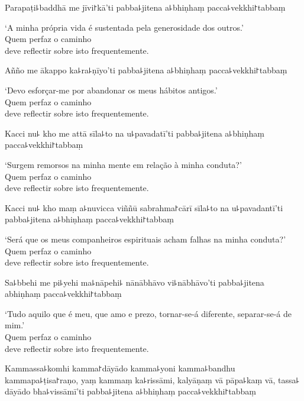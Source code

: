 \documentclass[
  babelLanguage=english,
  final,
  webversion,
]{chantingbook}
\begin{document}
Parapaṭi꜕baddhā me jīvi꜓kā'ti pabba꜕jitena a꜕bhiṇhaṃ pacca꜕vekkhi꜓tabbaṃ

\begin{english}
  `A minha própria vida é sustentada pela generosidade dos outros.'\\
  Quem perfaz o caminho\\
  deve reflectir sobre isto frequentemente.
\end{english}

Añño me ākappo ka꜕ra꜕ṇīyo'ti pabba꜕jitena a꜕bhiṇhaṃ pacca꜕vekkhi꜓tabbaṃ

\begin{english}
  `Devo esforçar-me por abandonar os meus hábitos antigos.'\\
  Quem perfaz o caminho\\
  deve reflectir sobre isto frequentemente.
\end{english}

\clearpage

Kacci nu꜕ kho me attā sīla꜕to na u꜕pavadatī'ti pabba꜕jitena a꜕bhiṇhaṃ pacca꜕vekkhi꜓tabbaṃ

\begin{english}
  `Surgem remorsos na minha mente em relação à minha conduta?'\\
  Quem perfaz o caminho\\
  deve reflectir sobre isto frequentemente.
\end{english}

Kacci nu꜕ kho maṃ a꜕nuvicca viññū sabrahma꜓cārī sīla꜕to na u꜕pavadantī'ti pabba꜕jitena a꜕bhiṇhaṃ pacca꜕vekkhi꜓tabbaṃ

\begin{english}
  `Será que os meus companheiros espirituais acham falhas na minha conduta?'\\
  Quem perfaz o caminho\\
  deve reflectir sobre isto frequentemente.
\end{english}

Sa꜕bbehi me pi꜕yehi ma꜕nāpehi꜕ nānābhāvo vi꜕nābhāvo'ti pabba꜕jitena abhiṇhaṃ pacca꜕vekkhi꜓tabbaṃ

\begin{english}
  `Tudo aquilo que é meu, que amo e prezo, tornar-se-á diferente, separar-se-á de mim.'\\
  Quem perfaz o caminho\\
  deve reflectir sobre isto frequentemente.
\end{english}

Kammassa꜕komhi kamma꜓dāyādo kamma꜕yoni kamma꜕bandhu kammapa꜕ṭisa꜓raṇo, yaṃ kammaṃ ka꜕rissāmi, kalyāṇaṃ vā pāpa꜕kaṃ vā, tassa꜕ dāyādo bha꜕vissāmī'ti pabba꜕jitena a꜕bhiṇhaṃ pacca꜕vekkhi꜓tabbaṃ
\end{document}
